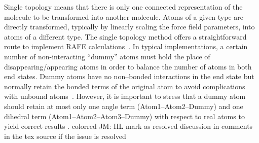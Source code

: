 \documentclass[journal=jctcce,manuscript=article]{achemso}
\begin{document}
Single topology means that there is only one connected representation of the molecule to be transformed into another molecule.
Atoms of a given type are directly transformed, typically by linearly scaling the force field parameters, into atoms of a different type.
The single topology method \cite{doi:10.1021/j100056a020, Michel2010,doi:10.1063/1.449208,doi:10.1021/j100056a020, doi:10.1021/jp981628n}
offers a straightforward route to implement RAFE calculations~\cite{doi:10.1021/j100056a020, Michel2010}.
In typical implementations,
a certain number of non-interacting ``dummy'' atoms must hold the place of disappearing/appearing atoms in order to balance the number of atoms in both end states.
Dummy atoms have no non--bonded interactions in the end state but normally retain the bonded
terms of the original atom to avoid complications with unbound
atoms~\cite{doi:10.1021/jp981628n}.
However, it is important to stress that a dummy atom should retain at most only
one angle term (Atom1--Atom2--Dummy) and one dihedral term
(Atom1--Atom2--Atom3--Dummy) with respect to real atoms
to yield correct results \cite{doi:10.1021/jp981628n,doi:10.1021/jp994193s}.
{color{red} JM: HL mark as resolved discussion in comments in the tex source if the issue is resolved }
%
\end{document}
